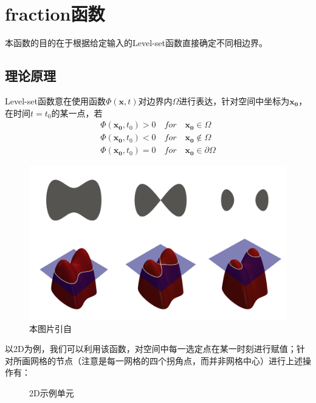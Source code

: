 \documentclass[lang=cn,11pt,a4paper]{elegantpaper}
\begin{document}
\section{fraction函数}\label{sec:fraction}
本函数的目的在于根据给定输入的Level-set函数直接确定不同相边界。
\subsection{理论原理}
Level-set函数意在使用函数$\Phi(\mathbf{x},t)$对边界内$\Omega$进行表达，针对空间中坐标为$\mathbf{x_0}$，在时间$t= t_0$的某一点，若
\begin{gather}
    \Phi(\mathbf{x_0},t_0)>0 \quad for \quad \mathbf{x_0}\in\Omega\nonumber\\
    \Phi(\mathbf{x_0},t_0)<0 \quad for \quad \mathbf{x_0}\notin\Omega\\
    \Phi(\mathbf{x_0},t_0)=0 \quad for \quad \mathbf{x_0}\in\partial\Omega\nonumber
\end{gather}
\begin{figure}[H]
    \centering
    \includegraphics[scale = 0.15]{Level_set_method.png}
    \caption{本图片引自\cite{NBS_2021}}
    \label{levelset}
\end{figure}
以2D为例，我们可以利用该函数，对空间中每一选定点在某一时刻进行赋值；针对所画网格的节点（注意是每一网格的四个拐角点，而并非网格中心）进行上述操作有：
\begin{figure}[H]
\begin{center}
\end{center}
\caption{2D示例单元}
\end{figure}
\end{document}
